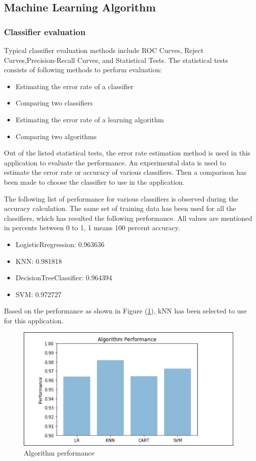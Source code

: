 \documentclass[sigconf]{acmart}
\begin{document}
\subsection{Machine Learning Algorithm}
\subsubsection{Classifier evaluation}
Typical classifier evaluation methods include ROC Curves, Reject Curves,Precision-Recall Curves, and Statistical Tests. The statistical tests consists of following methods to perform evaluation:
\begin{itemize}
    \item Estimating the error rate of a classifier
    \item Comparing two classifiers
    \item Estimating the error rate of a learning algorithm
    \item Comparing two algorithms
\end{itemize}

Out of the listed statistical tests, the error rate estimation method is used in this application to evaluate the performance. An experimental data is used to estimate the error rate or accuracy of various classifiers. Then a comparison has been made to choose the classifier to use in the application.

The following list of performance for various classifiers is observed during the accuracy calculation. The same set of training data has been used for all the classifiers, which has resulted the following performance. All values are mentioned in percents between 0 to 1, 1 means 100 percent accuracy.
\begin{itemize}
\item LogisticRregression: 0.963636 
\item KNN: 0.981818 
\item DecisionTreeClassifier: 0.964394 
\item SVM: 0.972727 
\end{itemize}

Based on the performance as shown in Figure (\ref{fig:Figure4}), kNN has been selected to use for this application. 

\begin{figure}
\includegraphics[width=1.0\columnwidth]{images/algperformance}
\caption{Algorithm performance} \label{fig:Figure4}
\end{figure}
\end{document}
